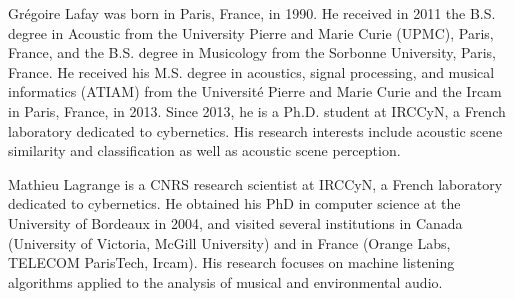 \documentclass[journal]{IEEEtran}
\begin{document}
\begin{IEEEbiography}{Gr\'egoire Lafay} was born in Paris, France, in 1990. He received in 2011 the B.S. degree in Acoustic from the University Pierre and Marie Curie (UPMC), Paris, France, and the B.S. degree in Musicology from the Sorbonne University, Paris, France. He received his M.S. degree in acoustics, signal processing, and musical informatics (ATIAM) from the Universit\'{e} Pierre and Marie Curie and the Ircam in Paris, France, in 2013. Since 2013, he is a Ph.D. student at IRCCyN, a French laboratory dedicated to cybernetics. His research interests include acoustic scene similarity and classification as well as acoustic scene perception. 
\end{IEEEbiography}

\begin{IEEEbiography}{Mathieu Lagrange} is a CNRS research scientist at IRCCyN, a French laboratory dedicated to cybernetics. He obtained his PhD in computer science at the University of Bordeaux in 2004, and visited several institutions in Canada (University of Victoria, McGill University) and in France (Orange Labs, TELECOM ParisTech, Ircam). His research focuses on machine listening algorithms applied to the analysis of musical and environmental audio.
\end{IEEEbiography}

% 
\end{document}
